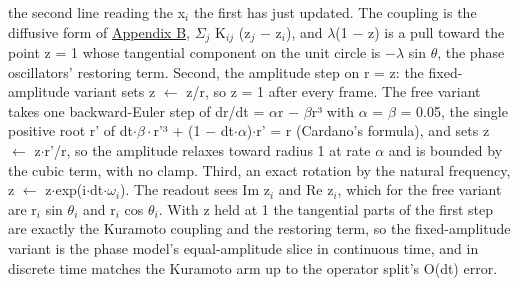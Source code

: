 \documentclass{article}
\begin{document}
the second line reading the x\ensuremath{_{i}} the first has just
updated. The coupling is the diffusive form of \hyperref[sec-B]{Appendix
B}, \ensuremath{\Sigma_{j}} K\ensuremath{_{ij}} (z\ensuremath{_{j}}
\ensuremath{-} z\ensuremath{_{i}}), and \ensuremath{\lambda}(1
\ensuremath{-} z) is a pull toward the point z = 1 whose tangential
component on the unit circle is \ensuremath{-\lambda} sin
\ensuremath{\theta}, the phase oscillators' restoring term. Second, the
amplitude step on r = \textbar z\textbar: the fixed-amplitude variant
sets z \ensuremath{\leftarrow} z/r, so \textbar z\textbar{} = 1 after
every frame. The free variant takes one backward-Euler step of dr/dt =
\ensuremath{\alpha}r \ensuremath{-} \ensuremath{\beta}r³ with
\ensuremath{\alpha} = \ensuremath{\beta} = 0.05, the single positive
root r' of dt\ensuremath{\cdot\beta\cdot}r'³ + (1 \ensuremath{-}
dt\ensuremath{\cdot\alpha})\ensuremath{\cdot}r' = r (Cardano's formula),
and sets z \ensuremath{\leftarrow} z\ensuremath{\cdot}r'/r, so the
amplitude relaxes toward radius 1 at rate \ensuremath{\alpha} and is
bounded by the cubic term, with no clamp. Third, an exact rotation by
the natural frequency, z \ensuremath{\leftarrow}
z\ensuremath{\cdot}exp(i\ensuremath{\cdot}dt\ensuremath{\cdot\omega_{i}}).
The readout sees Im z\ensuremath{_{i}} and Re z\ensuremath{_{i}}, which
for the free variant are r\ensuremath{_{i}} sin \ensuremath{\theta_{i}}
and r\ensuremath{_{i}} cos \ensuremath{\theta_{i}}. With
\textbar z\textbar{} held at 1 the tangential parts of the first step
are exactly the Kuramoto coupling and the restoring term, so the
fixed-amplitude variant is the phase model's equal-amplitude slice in
continuous time, and in discrete time matches the Kuramoto arm up to the
operator split's O(dt) error.
\end{document}
